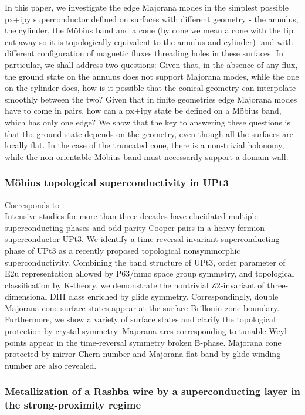 In this paper, we investigate the edge Majorana modes in the simplest possible px+ipy superconductor defined on surfaces with different geometry - the annulus, the cylinder, the Möbius band and a cone (by cone we mean a cone with the tip cut away so it is topologically equivalent to the annulus and cylinder)- and with different configuration of magnetic fluxes threading holes in these surfaces. In particular, we shall address two questions: Given that, in the absence of any flux, the ground state on the annulus does not support Majorana modes, while the one on the cylinder does, how is it possible that the conical geometry can interpolate smoothly between the two? Given that in finite geometries edge Majorana modes have to come in pairs, how can a px+ipy state be defined on a Möbius band, which has only one edge? We show that the key to answering these questions is that the ground state depends on the geometry, even though all the surfaces are locally flat. In the case of the truncated cone, there is a non-trivial holonomy, while the non-orientable Möbius band must necessarily support a domain wall. 

\subsubsection{Möbius topological superconductivity in UPt3}

Corresponds to \cite{2017Yanase}.\\

Intensive studies for more than three decades have elucidated multiple superconducting phases and odd-parity Cooper pairs in a heavy fermion superconductor UPt3. We identify a time-reversal invariant superconducting phase of UPt3 as a recently proposed topological nonsymmorphic superconductivity. Combining the band structure of UPt3, order parameter of E2u representation allowed by P63/mmc space group symmetry, and topological classification by K-theory, we demonstrate the nontrivial Z2-invariant of three-dimensional DIII class enriched by glide symmetry. Correspondingly, double Majorana cone surface states appear at the surface Brillouin zone boundary. Furthermore, we show a variety of surface states and clarify the topological protection by crystal symmetry. Majorana arcs corresponding to tunable Weyl points appear in the time-reversal symmetry broken B-phase. Majorana cone protected by mirror Chern number and Majorana flat band by glide-winding number are also revealed. 

\subsubsection{Metallization of a Rashba wire by a superconducting layer in the strong-proximity regime}

